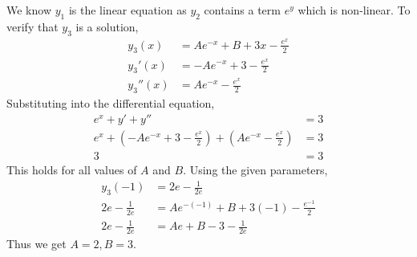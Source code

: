 \documentclass[titlepage]{article}
\begin{document}
We know $y_1$ is the linear equation as $y_2$ contains a term $e^y$ which is non-linear. To verify that $y_3$ is a solution,
\begin{align*}
y_3(x) &= Ae^{-x} + B + 3x - \frac{e^x}{2}
\\ y_3'(x) &= -Ae^{-x} + 3 - \frac{e^x}{2}
\\ y_3''(x) &= Ae^{-x} - \frac{e^x}{2}
\end{align*}
Substituting into the differential equation,
\begin{align*}
e^x + y' + y'' &= 3
\\ e^x + (-Ae^{-x} + 3 - \frac{e^x}{2}) + (Ae^{-x} - \frac{e^x}{2}) &= 3
\\ 3 &= 3
\end{align*}
This holds for all values of $A$ and $B$. Using the given parameters,
\begin{align*}
y_3(-1) &= 2e - \frac{1}{2e}
\\ 2e - \frac{1}{2e} &= Ae^{-(-1)} + B + 3(-1) - \frac{e^{-1}}{2}
\\ 2e - \frac{1}{2e} &= Ae + B - 3 - \frac{1}{2e}
\end{align*}
Thus we get $A = 2, B = 3$.
\end{document}

